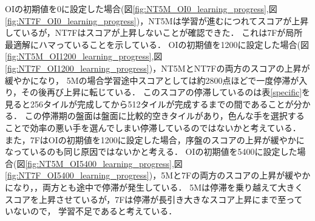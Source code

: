 OIの初期値を0に設定した場合(図\ref{fig:NT5M_OI0_learning_progress},図\ref{fig:NT7F_OI0_learning_progress})，NT5Mは学習が進むにつれてスコアが上昇しているが，NT7Fはスコアが上昇しないことが確認できた．
これは7Fが局所最適解にハマっていることを示している．
OIの初期値を1200に設定した場合(図\ref{fig:NT5M_OI1200_learning_progress},図\ref{fig:NT7F_OI1200_learning_progress})，NT5MとNT7Fの両方のスコアの上昇が緩やかになり，
5Mの場合学習途中スコアとしては約2800点ほどで一度停滞が入り，その後再び上昇に転じている．
このスコアの停滞しているのは表\ref{specific}を見ると256タイルが完成してから512タイルが完成するまでの間であることが分かる．
この停滞期の盤面は盤面に比較的空きタイルがあり，色んな手を選択することで効率の悪い手を選んでしまい停滞しているのではないかと考えている．
また，7FはOIの初期値を1200に設定した場合，序盤のスコアの上昇が緩やかになっているのも同じ原因ではないかと考える．
OIの初期値を5400に設定した場合(図\ref{fig:NT5M_OI5400_learning_progress},図\ref{fig:NT7F_OI5400_learning_progress})，5Mと7Fの両方のスコアの上昇が緩やかになり，，両方とも途中で停滞が発生している．
5Mは停滞を乗り越えて大きくスコアを上昇させているが，7Fは停滞が長引き大きなスコア上昇にまで至っていないので，
学習不足であると考えている．

